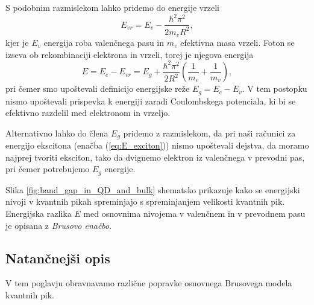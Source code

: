 \documentclass[twoside,11pt]{article}
\begin{document}
S podobnim razmislekom lahko pridemo do energije vrzeli
\begin{equation}
   E_{vr} = E_v - \frac{\hbar^2 \pi^2}{2m_vR^2},
\end{equation}
kjer je $E_v$ energija roba valenčnega pasu in $m_v$ efektivna masa vrzeli. Foton se izseva ob rekombinaciji elektrona in vrzeli, torej je njegova energija
\begin{equation}
   \label{eq:E_foton}
   E = E_e - E_{vr} = E_g + \frac{\hbar^2 \pi^2}{2R^2}\left(\frac{1}{m_e}+\frac{1}{m_v}\right),
\end{equation}
pri čemer smo upoštevali definicijo energijske reže $E_g = E_c - E_v$. V tem postopku nismo upoštevali prispevka k energiji zaradi Coulombskega potenciala, ki bi se efektivno razdelil med elektronom in vrzeljo.

Alternativno lahko do člena $E_g$ pridemo z razmislekom, da pri naši
računici za energijo ekscitona (enačba (\ref{eq:E_exciton})) nismo upoštevali dejstva, da moramo najprej tvoriti eksciton, tako da dvignemo elektron iz valenčnega
v prevodni pas, pri čemer potrebujemo $E_g$ energije.

Slika \ref{fig:band_gap_in_QD_and_bulk} shematsko prikazuje kako se energijski nivoji v kvantnih pikah spreminjajo s spreminjanjem velikosti kvantnih pik. Energijska razlika $E$ med osnovnima nivojema v valenčnem in
v prevodnem pasu je opisana z \textit{Brusovo enačbo}.

\subsection{Natančnejši opis}
V tem poglavju obravnavamo različne popravke osnovnega Brusovega modela kvantnih pik.
\end{document}
